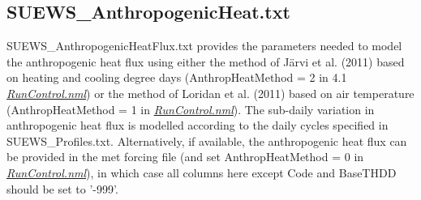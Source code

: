 \documentclass[letterpaper,10pt,english]{sphinxmanual}
\begin{document}
\subsection{SUEWS\_AnthropogenicHeat.txt}
\label{\detokenize{input_files/SUEWS_SiteInfo/SUEWS_AnthropogenicHeat::doc}}\label{\detokenize{input_files/SUEWS_SiteInfo/SUEWS_AnthropogenicHeat:suews-anthropogenicheat-txt}}
SUEWS\_AnthropogenicHeatFlux.txt provides the parameters needed to model
the anthropogenic heat flux using either the method of Järvi et al.
(2011) based on heating and cooling degree days (AnthropHeatMethod = 2
in 4.1 {\hyperref[\detokenize{input_files/SUEWS_SiteInfo/SUEWS_AnthropogenicHeat:RunControl.nml}]{\emph{RunControl.nml}}}) or the method of Loridan et
al. (2011) based on air temperature (AnthropHeatMethod = 1 in
{\hyperref[\detokenize{input_files/SUEWS_SiteInfo/SUEWS_AnthropogenicHeat:RunControl.nml}]{\emph{RunControl.nml}}}). The sub-daily variation in
anthropogenic heat flux is modelled according to the daily cycles
specified in SUEWS\_Profiles.txt. Alternatively, if available, the
anthropogenic heat flux can be provided in the met forcing file (and set
AnthropHeatMethod = 0 in {\hyperref[\detokenize{input_files/SUEWS_SiteInfo/SUEWS_AnthropogenicHeat:RunControl.nml}]{\emph{RunControl.nml}}}), in which
case all columns here except Code and BaseTHDD should be set to ’-999’.
\end{document}
